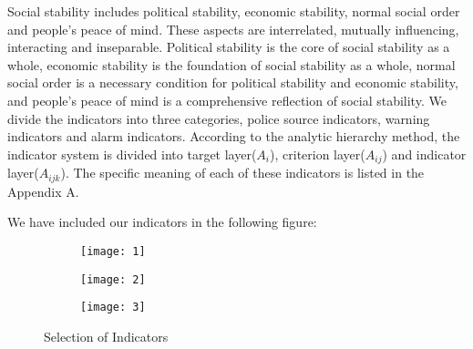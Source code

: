 \documentclass[12pt]{article}  %
\begin{document}
Social stability includes political stability, economic stability, normal social order and people's peace of mind. These aspects are interrelated, mutually influencing, interacting and inseparable. Political stability is the core of social stability as a whole, economic stability is the foundation of social stability as a whole, normal social order is a necessary condition for political stability and economic stability, and people's peace of mind is a comprehensive reflection of social stability. We divide the indicators into three categories, police source indicators, warning indicators and alarm indicators. According to the analytic hierarchy method, the indicator system is divided into target layer($A_i$), criterion layer($A_{ij}$) and indicator layer($A_{ijk}$). The specific meaning of each of these indicators is listed in the Appendix A.

We have included our indicators in the following figure:
\begin{figure}[htbp]
\centering
\begin{subfigure}[b]{.32\textwidth}
\texttt{[image: 1]}
\end{subfigure}
\begin{subfigure}[b]{.32\textwidth}
\texttt{[image: 2]}
\end{subfigure}
\begin{subfigure}[b]{.32\textwidth}
\texttt{[image: 3]}
\end{subfigure}
\caption{Selection of Indicators}
\end{figure}
\end{document}
